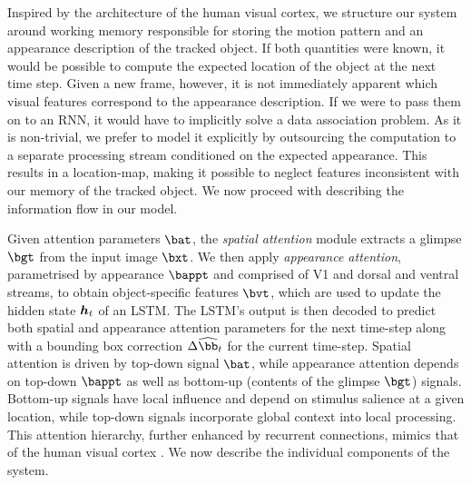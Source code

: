 	Inspired by the architecture of the human visual cortex, we structure our system around working memory responsible for storing the motion pattern and an appearance description of the tracked object. If both quantities were known, it would be possible to compute the expected location of the object at the next time step. Given a new frame, however, it is not immediately apparent which visual features correspond to the appearance description. If we were to pass them on to an RNN, it would have to implicitly solve a data association problem. As it is non-trivial, we prefer to model it explicitly by outsourcing the computation to a separate processing stream conditioned on the expected appearance. This results in a location-map, making it possible to neglect features inconsistent with our memory of the tracked object. We now proceed with describing the information flow in our model.
    
    Given attention parameters $\bat$, the \emph{spatial attention} module extracts a glimpse $\bgt$ from the input image $\bxt$. We then apply \emph{appearance attention}, parametrised by appearance $\bappt$ and comprised of V1 and dorsal and ventral streams, to obtain object-specific features $\bvt$, which are used to update the hidden state $\B{h}_t$ of an LSTM. The LSTM's output is then decoded to predict both spatial and appearance attention parameters for the next time-step along with a bounding box correction $\Delta \widehat{\bb}_t$ for the current time-step.
    Spatial attention is driven by top-down signal $\bat$, while appearance attention depends on top-down $\bappt$ as well as bottom-up (contents of the glimpse $\bgt$) signals. Bottom-up signals have local influence and depend on stimulus salience at a given location, while top-down signals incorporate global context into local processing. This attention hierarchy, further enhanced by recurrent connections, mimics that of the human visual cortex \cite{Ungerleider2000}. We now describe the individual components of the system.
    
